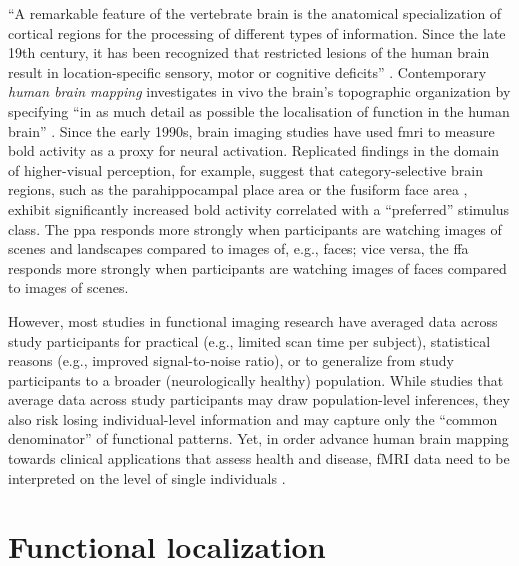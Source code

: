 
``A remarkable feature of the vertebrate brain is the anatomical specialization
of cortical regions for the processing of different types of information. Since
the late 19th century, it has been recognized that restricted lesions of the
human brain result in location-specific sensory, motor or cognitive deficits''
\citep[][p. 268]{cohen1994localization}.
Contemporary \textit{human brain mapping} \citep[e.g.,][]{raichle2009brief}
investigates in vivo the brain's topographic organization
\citep[e.g.,][]{eickhoff2018topographic} by specifying ``in as much detail as
possible the localisation of function in the human brain'' \citep[][p.
10]{savoy2001history}.
Since the early 1990s, brain imaging studies have used \ac{fmri} to
measure \ac{bold} activity as a proxy for neural activation.
Replicated findings in the domain of higher-visual perception, for example,
suggest that category-selective brain regions, such as the parahippocampal
place area \citep{epstein1998ppa, epstein1999parahippocampal} or the fusiform
face area \citep{kanwisher1997ffa, kanwisher2006fusiform}, exhibit significantly
increased \ac{bold} activity correlated with a ``preferred'' stimulus class.
%
The \ac{ppa} responds more strongly when participants are watching images of
scenes and landscapes compared to images of, e.g., faces;
%
vice versa, the \ac{ffa} responds more strongly when participants are watching
images of faces compared to images of scenes.

%
However, most studies in functional imaging research have averaged data across
study participants for
%
practical (e.g., limited scan time per subject),
%
statistical reasons (e.g., improved signal-to-noise ratio),  %
%
or to generalize from study participants to a broader (neurologically healthy)
population.
%
While studies that average data across study participants may draw
population-level inferences, they also risk losing individual-level information
and may capture only the ``common denominator'' \citep[][p.  2]{pinel2007fast}
of functional patterns.
%
Yet, in order advance human brain mapping towards clinical applications that
assess health and disease, fMRI data need to be interpreted on the level of
single individuals \citep{dubois2016building, wegrzyn2018thought}.



\section{Functional localization}

